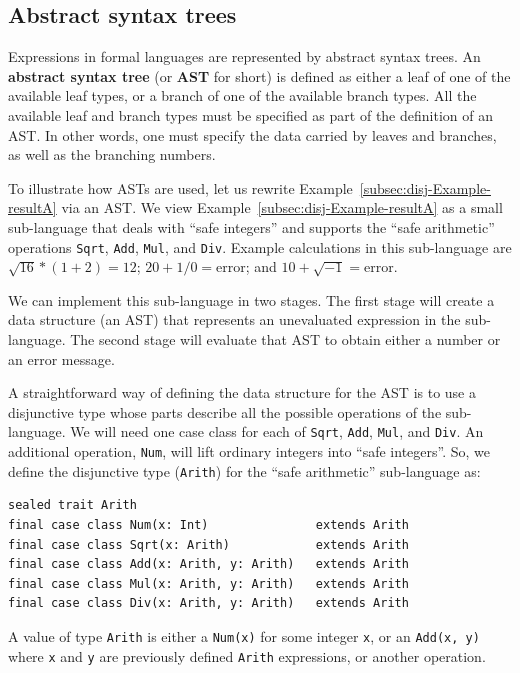 \subsection{Abstract syntax trees}

Expressions in formal languages are represented by abstract syntax
trees. An \textbf{abstract syntax tree}\textbf{
}(or \textbf{AST} for short) is defined as either a leaf of one of
the available leaf types, or a branch of one of the available branch
types. All the available leaf and branch types must be specified as
part of the definition of an AST. In other words, one must specify
the data carried by leaves and branches, as well as the branching
numbers.

To illustrate how ASTs are used, let us rewrite Example~\ref{subsec:disj-Example-resultA}
via an AST. We view Example~\ref{subsec:disj-Example-resultA} as
a small sub-language that deals with \textsf{``}safe integers\textsf{''} and supports
the \textsf{``}safe arithmetic\textsf{''} operations \lstinline!Sqrt!, \lstinline!Add!,
\lstinline!Mul!, and \lstinline!Div!. Example calculations in this
sub-language are $\sqrt{16}*(1+2)=12$; $20+1/0=\text{error}$; and
$10+\sqrt{-1}=\text{error}$. 

We can implement this sub-language in two stages. The first stage
will create a data structure (an AST) that represents an unevaluated
expression in the sub-language. The
second stage will evaluate that AST to obtain either a number or an
error message.

A straightforward way of defining the data structure for the AST is
to use a disjunctive type whose parts describe all the possible operations
of the sub-language. We will need one case class for each of \lstinline!Sqrt!,
\lstinline!Add!, \lstinline!Mul!, and \lstinline!Div!. An additional
operation, \lstinline!Num!, will lift ordinary integers into \textsf{``}safe
integers\textsf{''}. So, we define the disjunctive type (\lstinline!Arith!)
for the \textsf{``}safe arithmetic\textsf{''} sub-language as:
\begin{lstlisting}
sealed trait Arith
final case class Num(x: Int)               extends Arith
final case class Sqrt(x: Arith)            extends Arith
final case class Add(x: Arith, y: Arith)   extends Arith
final case class Mul(x: Arith, y: Arith)   extends Arith
final case class Div(x: Arith, y: Arith)   extends Arith
\end{lstlisting}
A value of type \lstinline!Arith! is either a \lstinline!Num(x)!
for some integer \lstinline!x!, or an \lstinline!Add(x, y)! where
\lstinline!x! and \lstinline!y! are previously defined \lstinline!Arith!
expressions, or another operation.

